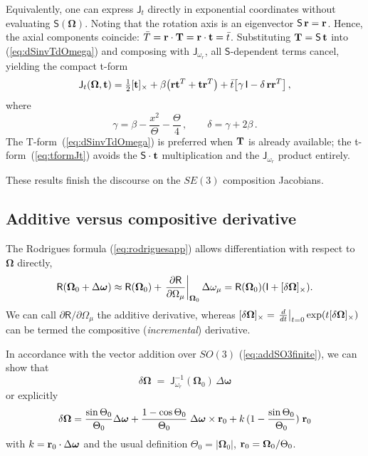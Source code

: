 \documentclass[journal]{IEEEtran}
\newcommand{\bfomega}{\boldsymbol{\omega}}
\newcommand{\bfOmega}{\boldsymbol{\Omega}}
\newcommand{\beq}{\begin{equation}}
\newcommand{\eeq}{\end{equation}}
\begin{document}
Equivalently, one can express $\mathsf{J}_t$ directly in exponential
coordinates without evaluating $\mathsf{S}(\bfOmega)$.
Noting that the rotation axis is an eigenvector $\mathsf{S}\,{\bf r} = {\bf r}$. Hence,
the axial components coincide: $\bar T = {\bf r}\cdot{\bf T} = {\bf r}\cdot{\bf t} = \bar t$.
Substituting ${\bf T} = \mathsf{S}\,{\bf t}$ into (\ref{eq:dSinvTdOmega})
and composing with $\mathsf{J}_{\omega_r}$, all $\mathsf{S}$-dependent terms
cancel, yielding the compact t-form
\beq
    \mathsf{J}_t(\bfOmega,{\bf t}) =
    \tfrac{1}{2}[{\bf t}]_\times
    + \beta\!\left({\bf r}{\bf t}^T + {\bf t}{\bf r}^T\right)
    + \bar t\!\left[\gamma\,\mathsf{I} - \delta\,{\bf r}{\bf r}^T\right],
    \label{eq:tformJt}
\eeq
where
\beq
    \gamma = \beta - \frac{x^2}{\Theta} - \frac{\Theta}{4}\,,\qquad
    \delta = \gamma + 2\beta\,.
    \label{eq:tformcoeffs}
\eeq
The T-form~(\ref{eq:dSinvTdOmega}) is preferred when ${\bf T}$ is already
available; the t-form~(\ref{eq:tformJt}) avoids the $\mathsf{S}\cdot{\bf t}$
multiplication and the $\mathsf{J}_{\omega_r}$ product entirely.

These results finish the discourse on the $SE(3)$ composition Jacobians.

\subsection{Additive versus compositive derivative}
\label{app:addvscomp}
The Rodrigues formula (\ref{eq:rodriguesapp}) allows differentiation with respect to $\bfOmega$ directly,
\beq
    \mathsf{R}(\bfOmega_0+\Delta\bfomega) \approx 
    \mathsf{R}(\bfOmega_0) + \left. {\partial\mathsf{R}\over \partial\Omega_\mu} \right|_{\bfOmega_0}
    \Delta\omega_\mu = \mathsf{R}(\bfOmega_0) ( \mathsf{I} + [\delta\bfOmega]_\times ).
    \label{eq:rodriguesder}
\eeq
We can call $\partial\mathsf{R}/ \partial\Omega_\mu$ the additive derivative, whereas 
$[\delta\bfOmega]_\times = \left.{d\over dt}\right|_{t=0} \exp( t [\delta\bfOmega]_\times )$
can be termed the compositive ({\em incremental}) derivative.

In accordance with the vector addition over $SO(3)$ (\ref{eq:addSO3finite}), we can show that
\beq
     \delta\bfOmega \; = \; \mathsf{J}^{-1}_{\omega_r}(\bfOmega_0)\, \Delta\bfomega
    \label{eq:SO3localglobal}
\eeq
or explicitly
\beq
    \delta{\bfOmega}=
    {\sin\Theta_0\over\Theta_0} \Delta\bfomega + {1-\cos\Theta_0\over\Theta_0}\; \Delta\bfomega\times{\bf r}_0 +
    k\,(1-{\sin\Theta_0\over\Theta_0}) \; {\bf r}_0
    \nonumber
\eeq
with $k={\bf r}_0\cdot\Delta\bfomega$ and the usual definition $\Theta_0=|\bfOmega_0|$,
${\bf r}_0 = \bfOmega_0/\Theta_0$.
\end{document}
